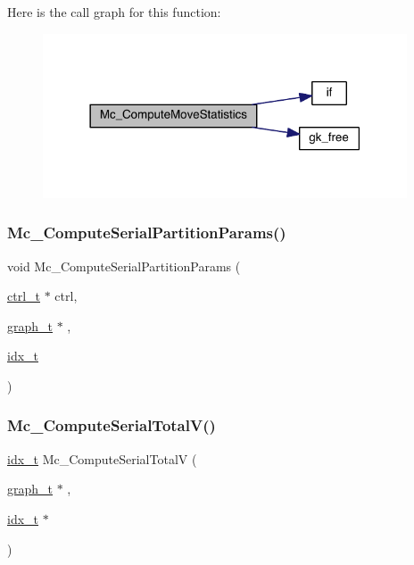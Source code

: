 Here is the call graph for this function\+:\nopagebreak
\begin{figure}[H]
\begin{center}
\leavevmode
\includegraphics[width=306pt]{a00951_ada2830ee390c9e4a693b86662cf46b8f_cgraph}
\end{center}
\end{figure}
\mbox{\label{a00951_a3c30e5e0973bdf7820a9493fa077aad1}} 
\subsubsection{\texorpdfstring{Mc\+\_\+\+Compute\+Serial\+Partition\+Params()}{Mc\_ComputeSerialPartitionParams()}}
{\footnotesize\ttfamily void Mc\+\_\+\+Compute\+Serial\+Partition\+Params (\begin{DoxyParamCaption}\item[{\hyperlink{a00742}{ctrl\+\_\+t} $\ast$}]{ctrl,  }\item[{\hyperlink{a00734}{graph\+\_\+t} $\ast$}]{,  }\item[{\hyperlink{a00876_aaa5262be3e700770163401acb0150f52}{idx\+\_\+t}}]{ }\end{DoxyParamCaption})}

\mbox{\label{a00951_a1af8b4d803fad96ac4b963048e25c8d1}} 
\subsubsection{\texorpdfstring{Mc\+\_\+\+Compute\+Serial\+Total\+V()}{Mc\_ComputeSerialTotalV()}}
{\footnotesize\ttfamily \hyperlink{a00876_aaa5262be3e700770163401acb0150f52}{idx\+\_\+t} Mc\+\_\+\+Compute\+Serial\+TotalV (\begin{DoxyParamCaption}\item[{\hyperlink{a00734}{graph\+\_\+t} $\ast$}]{,  }\item[{\hyperlink{a00876_aaa5262be3e700770163401acb0150f52}{idx\+\_\+t} $\ast$}]{ }\end{DoxyParamCaption})}

